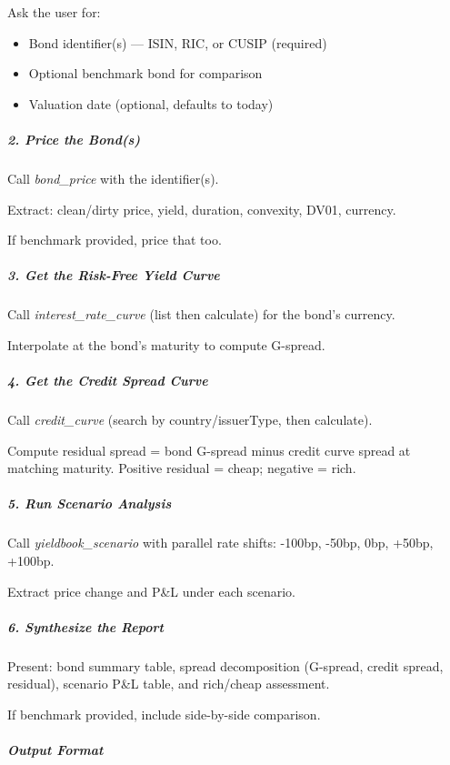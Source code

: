 \documentclass[11pt]{article}
\begin{document}
Ask the user for:

\begin{itemize}[leftmargin=*,itemsep=2pt,topsep=2pt]
\item {} Bond identifier(s) — ISIN, RIC, or CUSIP (required)
\item {} Optional benchmark bond for comparison
\item {} Valuation date (optional, defaults to today)
\end{itemize}

\subparagraph{2. Price the Bond(s)}\mbox{}\par

Call \emph{bond\_\allowbreak{}price} with the identifier(s).


Extract: clean/dirty price, yield, duration, convexity, DV01, currency.


If benchmark provided, price that too.


\subparagraph{3. Get the Risk-Free Yield Curve}\mbox{}\par

Call \emph{interest\_\allowbreak{}rate\_\allowbreak{}curve} (list then calculate) for the bond's currency.


Interpolate at the bond's maturity to compute G-spread.


\subparagraph{4. Get the Credit Spread Curve}\mbox{}\par

Call \emph{credit\_\allowbreak{}curve} (search by country/issuerType, then calculate).


Compute residual spread = bond G-spread minus credit curve spread at matching maturity. Positive residual = cheap; negative = rich.


\subparagraph{5. Run Scenario Analysis}\mbox{}\par

Call \emph{yieldbook\_\allowbreak{}scenario} with parallel rate shifts: -100bp, -50bp, 0bp, +50bp, +100bp.


Extract price change and P\&L under each scenario.


\subparagraph{6. Synthesize the Report}\mbox{}\par

Present: bond summary table, spread decomposition (G-spread, credit spread, residual), scenario P\&L table, and rich/cheap assessment.


If benchmark provided, include side-by-side comparison.


\subparagraph{Output Format}\mbox{}\par
\end{document}
